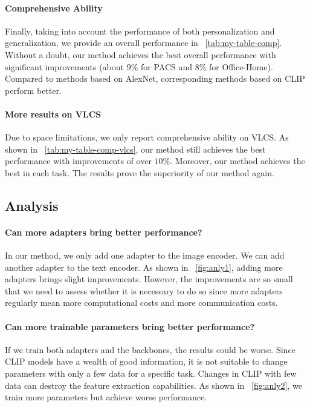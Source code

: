 \documentclass[11pt]{article}
\begin{document}
\paragraph{Comprehensive Ability}

Finally, taking into account the performance of both personalization and generalization, we provide an overall performance in \tablename~\ref{tab:my-table-comp}.
Without a doubt, our method achieves the best overall performance with significant improvements (about $9\%$ for PACS and $8\%$ for Office-Home).
Compared to methods based on AlexNet, corresponding methods based on CLIP perform better.

\paragraph{More results on VLCS}

Due to space limitations, we only report comprehensive ability on VLCS.
As shown in \tablename~\ref{tab:my-table-comp-vlcs}, our method still achieves the best performance with improvements of over $10\%$.
Moreover, our method achieves the best in each task.
The results prove the superiority of our method again.


\subsection{Analysis}

\paragraph{Can more adapters bring better performance?}
In our method, we only add one adapter to the image encoder.
We can add another adapter to the text encoder.
As shown in \figurename~\ref{fig:anly1}, adding more adapters brings slight improvements.
However, the improvements are so small that we need to assess whether it is necessary to do so since more adapters regularly mean more computational costs and more communication costs.

\paragraph{Can more trainable parameters bring better performance?}
If we train both adapters and the backbones, the results could be worse.
Since CLIP models have a wealth of good information, it is not suitable to change parameters with only a few data for a specific task.
Changes in CLIP with few data can destroy the feature extraction capabilities.
As shown in \figurename~\ref{fig:anly2}, we train more parameters but achieve worse performance.
\end{document}
